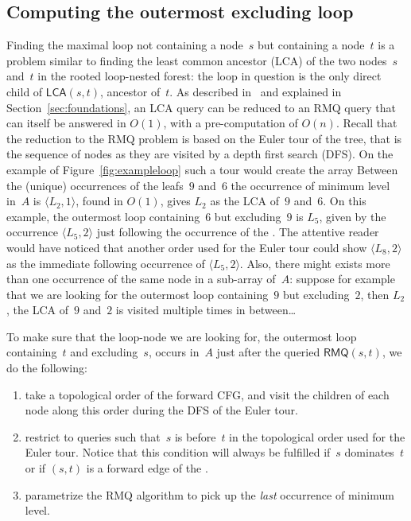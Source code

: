 \newcommand{\couple}[2]{\langle#1,#2\rangle}
\def\sep{,$ $}

\subsection{Computing the outermost excluding loop}
\label{sec:ole}
Finding the maximal loop not containing a node~$s$ but containing a node~$t$ is a problem similar to finding the least common ancestor (LCA) of the two nodes~$s$ and~$t$ in the rooted loop-nested forest:
the loop in question is the only direct child of $\textsf{LCA}(s,t)$, ancestor of~$t$.
As described in~\cite{BenderFC00} and explained in Section~\ref{sec:foundations}, an LCA query can be reduced to an RMQ query that can itself be answered in $O(1)$, with a pre-computation of $O(n)$.
Recall that the reduction to the RMQ problem is based on the Euler tour of the tree, that is the sequence of nodes as they are visited by a depth first search (DFS).
On the example of Figure~\ref{fig:exampleloop} such a tour would create the array%
Between the (unique) occurrences of the leafs~$9$ and~$6$ the occurrence of minimum level in~$A$ is $\couple{L_2}{1}$, found in $O(1)$, gives $L_2$ as the LCA of~$9$ and~$6$.
On this example, the outermost loop containing~$6$ but excluding~$9$ is $L_5$, given by the occurrence $\couple{L_5}{2}$ just following the occurrence of the \@LCA.
The attentive reader would have noticed that another order used for the Euler tour could show $\couple{L_8}{2}$ as the immediate following occurrence of $\couple{L_5}{2}$.
Also, there might exists more than one occurrence of the same node in a sub-array of~$A$:
suppose for example that we are looking for the outermost loop containing~$9$ but excluding~$2$, then $L_2$, the LCA of~$9$ and~$2$ is visited multiple times in between\ldots

To make sure that the loop-node we are looking for, \ie the outermost loop containing~$t$ and excluding~$s$, occurs in~$A$ just after the queried $\textsf{RMQ}(s,t)$, we do the following:
\begin{enumerate}
\item
	take a topological order of the forward CFG, and visit the children of each node along this order during the DFS of the Euler tour.
\item
	restrict to queries such that~$s$ is before~$t$ in the topological order used for the Euler tour.
	Notice that this condition will always be fulfilled if~$s$ dominates~$t$ or if $(s,t)$ is a forward edge of the \@CFG.
\item
	parametrize the RMQ algorithm to pick up the \emph{last} occurrence of minimum level.
\end{enumerate}

